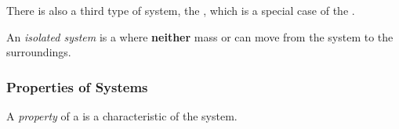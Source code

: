 There is also a third type of system, the , which is a special case of the .
\begin{definition}\label{def:Isolated_System}
  An \emph{isolated system} is a  where \textbf{neither} mass or  can move from the system to the surroundings.
\end{definition}

\subsubsection{Properties of Systems}\label{subsubsec:Properties_Systems}
\begin{definition}[Property]\label{def:Property}
  A \emph{property} of a  is a characteristic of the system.
\end{definition}


